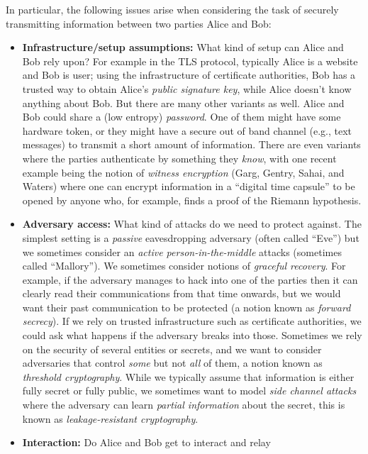 In particular, the following issues arise when considering the task of
securely transmitting information between two parties Alice and Bob:

\begin{itemize}
\item
  \textbf{Infrastructure/setup assumptions:} What kind of setup can
  Alice and Bob rely upon? For example in the TLS protocol, typically
  Alice is a website and Bob is user; using the infrastructure of
  certificate authorities, Bob has a trusted way to obtain Alice's
  \emph{public signature key}, while Alice doesn't know anything about
  Bob. But there are many other variants as well. Alice and Bob could
  share a (low entropy) \emph{password}. One of them might have some
  hardware token, or they might have a secure out of band channel (e.g.,
  text messages) to transmit a short amount of information. There are
  even variants where the parties authenticate by something they
  \emph{know}, with one recent example being the notion of \emph{witness
  encryption} (Garg, Gentry, Sahai, and Waters) where one can encrypt
  information in a ``digital time capsule'' to be opened by anyone who,
  for example, finds a proof of the Riemann hypothesis.
\item
  \textbf{Adversary access:} What kind of attacks do we need to protect
  against. The simplest setting is a \emph{passive} eavesdropping
  adversary (often called ``Eve'') but we sometimes consider an
  \emph{active person-in-the-middle} attacks (sometimes called
  ``Mallory''). We sometimes consider notions of \emph{graceful
  recovery}. For example, if the adversary manages to hack into one of
  the parties then it can clearly read their communications from that
  time onwards, but we would want their past communication to be
  protected (a notion known as \emph{forward secrecy}). If we rely on
  trusted infrastructure such as certificate authorities, we could ask
  what happens if the adversary breaks into those. Sometimes we rely on
  the security of several entities or secrets, and we want to consider
  adversaries that control \emph{some} but not \emph{all} of them, a
  notion known as \emph{threshold cryptography}. While we typically
  assume that information is either fully secret or fully public, we
  sometimes want to model \emph{side channel attacks} where the
  adversary can learn \emph{partial information} about the secret, this
  is known as \emph{leakage-resistant cryptography}.
\item
  \textbf{Interaction:} Do Alice and Bob get to interact and relay

\end{itemize}
